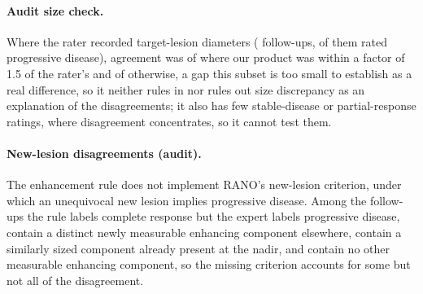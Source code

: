 \documentclass[11pt]{article}
\begin{document}
\paragraph{Audit size check.} Where the rater recorded target-lesion diameters (\vfourSizeN{} follow-ups, \vfourSizeExpertPD{} of them rated progressive disease), agreement was \vfourSizeCloseAgree{} of \vfourSizeCloseN{} where our product was within a factor of 1.5 of the rater's and \vfourSizeOtherAgree{} of \vfourSizeOtherN{} otherwise, a gap this subset is too small to establish as a real difference, so it neither rules in nor rules out size discrepancy as an explanation of the disagreements; it also has few stable-disease or partial-response ratings, where disagreement concentrates, so it cannot test them.

\paragraph{New-lesion disagreements (audit).} The enhancement rule does not implement RANO's new-lesion criterion, under which an unequivocal new lesion implies progressive disease. Among the \vfourNewLesionN{} follow-ups the rule labels complete response but the expert labels progressive disease, \vfourNewLesionPlausible{} contain a distinct newly measurable enhancing component elsewhere, \vfourNewLesionPreexisting{} contain a similarly sized component already present at the nadir, and \vfourNewLesionNone{} contain no other measurable enhancing component, so the missing criterion accounts for some but not all of the disagreement.
\end{document}
